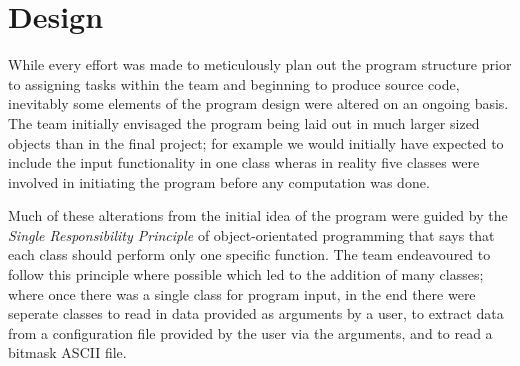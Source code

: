 \section{Design}
\label{Design}
While every effort was made to meticulously plan out the program structure prior to assigning tasks within the team and beginning to produce source code, inevitably some elements of the program design were altered on an ongoing basis. The team initially envisaged the program being laid out in much larger sized objects than in the final project; for example we would initially have expected to include the input functionality in one class wheras in reality five classes were involved in initiating the program before any computation was done. 

Much of these alterations from the initial idea of the program were guided by the \textit{Single Responsibility Principle}\cite{ref:srm} of object-orientated programming that says that each class should perform only one specific function. The team endeavoured to follow this principle where possible which led to the addition of many classes; where once there was a single class for program input, in the end there were seperate classes to read in data provided as arguments by a user, to extract data from a configuration file provided by the user via the arguments, and to read a bitmask ASCII file.
